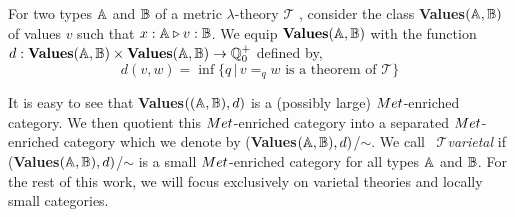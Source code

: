 \documentclass[a4paper,UKenglish,cleveref, autoref, thm-restate]{lipics-v2021}
\begin{document}
For two types $\mathbb{A}$ and $\mathbb{B}$ of a metric $\lambda$-theory $\mathscr{T}$ , consider the class \textbf{Values}$(\mathbb{A},\mathbb{B})$ of values $v$ such that $x : \mathbb{A} \triangleright v : \mathbb{B}$. We equip $\textbf{Values}(\mathbb{A},\mathbb{B})$ with the function $d :\textbf{Values}(\mathbb{A},\mathbb{B}) \times \textbf{Values}(\mathbb{A},\mathbb{B}) \rightarrow \mathbb{Q}^{+}_0$ defined by,
$$d(v,w)=\inf{\{q \, \vert \, v=_q w \text{ is a theorem of } \mathscr{T} \}}$$

It is easy to see that \textbf{Values}$((\mathbb{A},\mathbb{B}),d)$ is a (possibly large)  $\catMet$-enriched category. We then quotient this  $\catMet$-enriched category into a separated  $\catMet$-enriched category which we denote by (\textbf{Values}$(\mathbb{A},\mathbb{B}),d)$/$\sim$. We call  $\mathscr{T} $\emph{varietal} if (\textbf{Values}$(\mathbb{A},\mathbb{B}),d)$/$\sim$ is a small  $\catMet$-enriched category for all types $\mathbb{A}$ and $\mathbb{B}$. For the rest of this work, we will focus exclusively on varietal theories and locally small categories.
\end{document}
